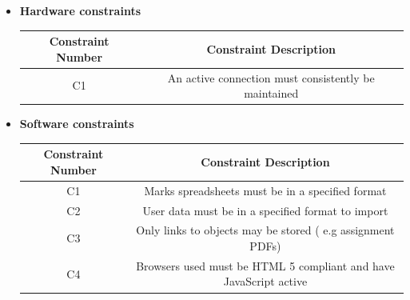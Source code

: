 \documentclass[a4paper,12pt]{article}
\begin{document}
        \begin{itemize}
       		\item \textbf{Hardware constraints}
        	\begin{center}
        		
        		\begin{tabular}{ |c|c| }
        			
        			\hline
        			Constraint Number & Constraint Description \\
        			\hline
        			C1 & An active connection must consistently be maintained \\
        			\hline
        			
        		\end{tabular}
        	\end{center}
        	\item \textbf{Software constraints}
               \begin{center}
               	
		        	\begin{tabular}{ |c|c| }
		        		 
		        		\hline
		        		Constraint Number & Constraint Description \\
		        		\hline
		        		C1 & Marks spreadsheets must be in a specified format \\
		        		\hline
		        		C2 & User data must be in a specified format to import  \\
		        		\hline
		        		C3 & Only links to objects may be stored ( e.g assignment PDFs) \\
		        		\hline
		        		C4 & Browsers used must be HTML 5 compliant and have JavaScript active \\
		        		\hline
		        		
		        	\end{tabular}
        		\end{center}
        \end{itemize}
    
    	\pagebreak
    	
\end{document}

